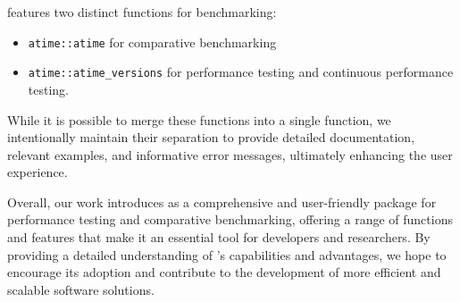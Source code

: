  features two distinct functions for benchmarking: 
\begin{itemize}
 

    \item\texttt{atime::atime} for comparative benchmarking \item\texttt{atime::atime\_versions} for performance testing and continuous performance testing. 

\end{itemize}

While it is possible to merge these functions into a single function, we intentionally maintain their separation to provide detailed documentation, relevant examples, and informative error messages, ultimately enhancing the user experience.

Overall, our work introduces  as a comprehensive and user-friendly package for performance testing and comparative benchmarking, offering a range of functions and features that make it an essential tool for developers and researchers. By providing a detailed understanding of 's capabilities and advantages, we hope to encourage its adoption and contribute to the development of more efficient and scalable software solutions.









